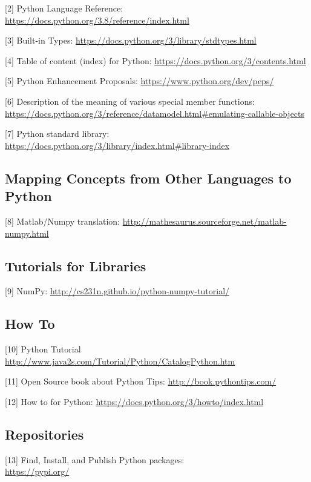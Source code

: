 \documentclass[
]{article}
\begin{document}
{[}2{]} Python Language Reference:
\url{https://docs.python.org/3.8/reference/index.html}

{[}3{]} Built-in Types:
\url{https://docs.python.org/3/library/stdtypes.html}

{[}4{]} Table of content (index) for Python:
\url{https://docs.python.org/3/contents.html}

{[}5{]} Python Enhancement Proposals:
\url{https://www.python.org/dev/peps/}

{[}6{]} Description of the meaning of various special member functions:
\url{https://docs.python.org/3/reference/datamodel.html\#emulating-callable-objects}

{[}7{]} Python standard library:
\url{https://docs.python.org/3/library/index.html\#library-index}

\hypertarget{mapping-concepts-from-other-languages-to-python}{%
\subsection{Mapping Concepts from Other Languages to
Python}\label{mapping-concepts-from-other-languages-to-python}}

{[}8{]} Matlab/Numpy translation:
\url{http://mathesaurus.sourceforge.net/matlab-numpy.html}

\hypertarget{tutorials-for-libraries}{%
\subsection{Tutorials for Libraries}\label{tutorials-for-libraries}}

{[}9{]} NumPy: \url{http://cs231n.github.io/python-numpy-tutorial/}

\hypertarget{how-to}{%
\subsection{How To}\label{how-to}}

{[}10{]} Python Tutorial
\url{http://www.java2s.com/Tutorial/Python/CatalogPython.htm}

{[}11{]} Open Source book about Python Tips:
\url{http://book.pythontips.com/}

{[}12{]} How to for Python:
\url{https://docs.python.org/3/howto/index.html}

\hypertarget{repositories}{%
\subsection{Repositories}\label{repositories}}

{[}13{]} Find, Install, and Publish Python packages:\\
\url{https://pypi.org/}
\end{document}
